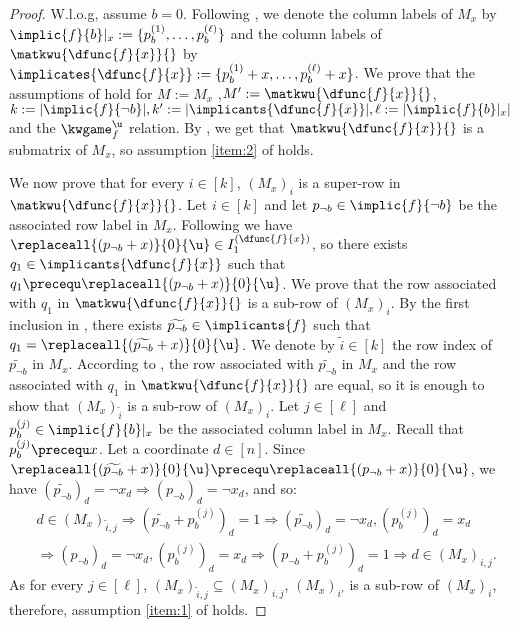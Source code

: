 \documentclass[acmsmall, nonacm, authorversion]{acmart}
\begin{document}
\begin{proof}
W.l.o.g, assume $b=0$. Following , we denote the column labels of $M_x$ by $\implic{f}{b}|_{x}:=\{p_b^{(1)},\dots,p_b^{(\ell)}\}$ and the column labels of $\matkwu{\dfunc{f}{x}}{}$ by $\implicates{\dfunc{f}{x}}:=\{p_b^{(1)}+x,\dots,p_b^{(\ell)}+x\}$.
We prove that the assumptions of  hold for $M:=M_x$ ,$M':=\matkwu{\dfunc{f}{x}}{}$, $k:=|\implic{f}{\neg b}|, k':=|\implicants{\dfunc{f}{x}}|, \ell:=|\implic{f}{b}|_x|$ and the $\kwgame^\u_f$ relation.
By , we get that $\matkwu{\dfunc{f}{x}}{}$ is a submatrix of $M_x$, so assumption \ref{item:2} of  holds. 

We now prove that for every $i\in [k]$, $(M_x)_i$ is a super-row in $\matkwu{\dfunc{f}{x}}{}$.
Let $i\in[k]$ and let $p_{\neg b} \in 
\implic{f}{\neg b}$ be the associated row label in $M_x$. Following  we have $\replaceall{(p_{\neg b}+x)}{0}{\u}\in I_1^{(\dfunc{f}{x})}$, so there exists $q_1\in\implicants{\dfunc{f}{x}}$ such that $q_1\precequ \replaceall{(p_{\neg b}+x)}{0}{\u}$. We prove that the row associated with $q_1$ in $\matkwu{\dfunc{f}{x}}{}$ is a sub-row of $(M_x)_i$. By the first inclusion in , there exists $\widetilde{p_{\neg b}}\in\implicants{f}$ such that $q_1=\replaceall{(\widetilde{p_{\neg b}}+x)}{0}{\u}$. We denote by $\tilde{i}\in [k]$ the row index of $\widetilde{p_{\neg b}}$ in $M_x$. 
According to , the row associated with $\widetilde{p_{\neg b}}$ in $M_x$ and the row associated with $q_1$ in $\matkwu{\dfunc{f}{x}}{}$ are equal, so it is enough to show that $(M_x)_{\tilde{i}}$ is a sub-row of $(M_x)_i$. Let $j\in [\ell]$ and $p_b^{(j)}\in \implic{f}{b}|_{x}$ be the associated column label in $M_x$. Recall that $p_b^{(j)}\precequ x$. Let a coordinate $d\in[n]$. Since $\replaceall{(\widetilde{p_{\neg b}}+x)}{0}{\u} \precequ\replaceall{(p_{\neg b}+x)}{0}{\u}$, we have $(\widetilde{p_{\neg b}})_d=\neg x_d \Rightarrow (p_{\neg b})_d=\neg x_d$, and so:
\begin{align*}
&d\in (M_x)_{\tilde{i},j}\Rightarrow(\widetilde{p_{\neg b}}+p_b^{(j)})_d=1\Rightarrow (\widetilde{p_{\neg b}})_d=\neg x_d, (p_b^{(j)})_d=x_d\\ 
&\Rightarrow(p_{\neg b})_d=\neg x_d, (p_b^{(j)})_d=x_d \Rightarrow (p_{\neg b}+p_b^{(j)})_d=1\Rightarrow d\in (M_x)_{i,j}.
\end{align*}
As for every $j\in [\ell]$, $(M_x)_{\tilde{i},j}\subseteq (M_x)_{i,j}$, $(M_x)_{i'}$ is a sub-row of $(M_x)_i$, therefore, assumption \ref{item:1} of  holds.
\end{proof}
\end{document}
